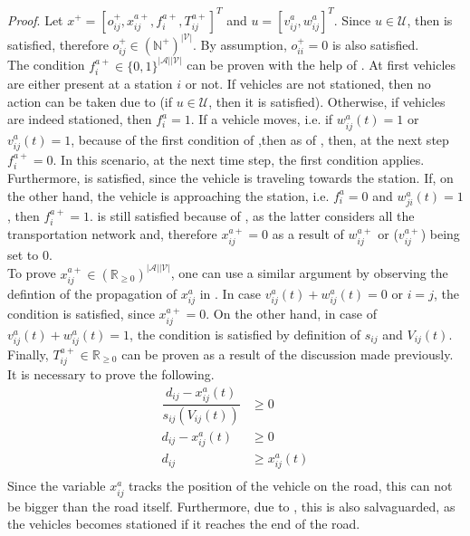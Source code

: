 \textit{Proof}. Let $x^+ = [o_{ij}^+, x_{ij}^{a+}, f^{a+}_{i}, T_{ij}^{a+}]^T$ and $u = [v^{a}_{ij}, w^{a}_{ij}]^T$. Since $u \in \mathcal{U}$, then  is satisfied, therefore $o_{ij}^+ \in (\mathbb{N}^+)^{|\mathcal{V}|}$. By assumption, $o_{ii}^+ = 0$ is also satisfied.\\
The condition $f^{a+}_{i} \in \{0,1\}^{|\mathcal{A}||\mathcal{V}|}$ can be proven with the help of . At first vehicles are either present at a station $i$ or not. If vehicles are not stationed, then no action can be taken due to  (if $u \in \mathcal{U}$, then it is satisfied). Otherwise, if vehicles are indeed stationed, then $f^{a}_{i} = 1$. If a vehicle moves, i.e. if $w^a_{ij}(t) = 1$ or $v^a_{ij}(t) = 1$, because of the first condition of ,then as of , then, at the next step $f^{a+}_{i} =0$. In this scenario, at the next time step, the first condition applies. Furthermore,  is satisfied, since the vehicle is traveling towards the station. If, on the other hand, the vehicle is approaching the station, i.e. $f^{a}_{i} =0$ and 
$w^a_{ji}(t) = 1$, then $f^{a+}_{i} =1$.  is still satisfied because of , as the latter considers all the transportation network and, therefore $ x_{ij}^{a+} = 0$ as a result of  $w_{ij}^{a+}$ or ($ v_{ij}^{a+}$) being set to 0.\\
To prove $x_{ij}^{a+}\in (\mathbb{R}_{\ge 0})^{|\mathcal{A}||\mathcal{V}|}$, one can use a similar argument by observing the defintion of the propagation of  $x_{ij}^a$ in  . In case $v^a_{ij}(t) + w^a_{ij}(t)= 0$ or $i=j$, the condition is satisfied, since  $x_{ij}^{a+} = 0$.  On the other hand, in case of $v^a_{ij}(t) + w^a_{ij}(t)= 1$, the condition is satisfied by definition of $s_{ij}$ and $V_{ij}(t)$. \\
Finally, $T_{ij}^{a+} \in \mathbb{R}_{\ge0}$ can be proven as a result of the discussion made previously. It is necessary to prove the following. 
\begin{align*}
	 \dfrac{d_{ij} - x^a_{ij}(t)}{s_{ij}(V_{ij}(t))} &\ge 0\\
	 d_{ij} - x^a_{ij}(t) &\ge 0\\
	 d_{ij} &\ge x^a_{ij}(t)\\
\end{align*}
Since the variable $x_{ij}^a$ tracks the position of the vehicle on the road, this can not be bigger than the road itself. Furthermore, due to , this is also salvaguarded, as the vehicles becomes stationed if it reaches the end of the road. \\

